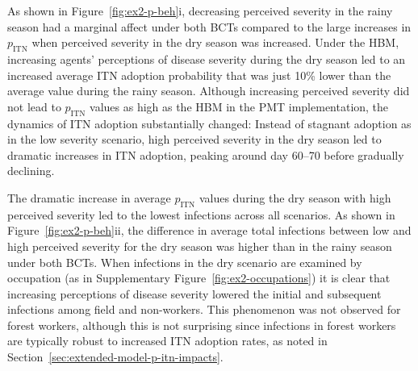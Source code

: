 As shown in Figure~\ref{fig:ex2-p-beh}i, decreasing perceived severity in the rainy season had a marginal affect under both BCTs compared to the large increases in $p_{\text{ITN}}$ when perceived severity in the dry season was increased. Under the HBM, increasing agents' perceptions of disease severity during the dry season led to an increased average ITN adoption probability that was just 10\% lower than the average value during the rainy season. Although increasing perceived severity did not lead to $p_{\text{ITN}}$ values as high as the HBM in the PMT implementation, the dynamics of ITN adoption substantially changed: Instead of stagnant adoption as in the low severity scenario, high perceived severity in the dry season led to dramatic increases in ITN adoption, peaking around day 60--70 before gradually declining.

The dramatic increase in average $p_{\text{ITN}}$ values during the dry season with high perceived severity led to the lowest infections across all scenarios. As shown in Figure~\ref{fig:ex2-p-beh}ii, the difference in average total infections between low and high perceived severity for the dry season was higher than in the rainy season under both BCTs. When infections in the dry scenario are examined by occupation (as in Supplementary Figure~\ref{fig:ex2-occupations}) it is clear that increasing perceptions of disease severity lowered the initial and subsequent infections among field and non-workers. This phenomenon was not observed for forest workers, although this is not surprising since infections in forest workers are typically robust to increased ITN adoption rates, as noted in Section~\ref{sec:extended-model-p-itn-impacts}.

